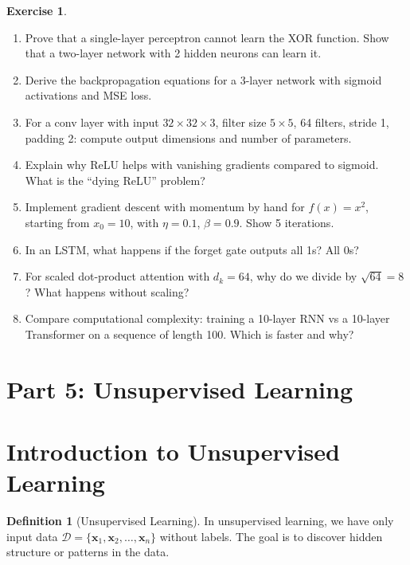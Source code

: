\documentclass[11pt,twoside]{article}
\numberwithin{equation}{section}
\newcommand{\vect}[1]{\bm{#1}}
\theoremstyle{plain}
\theoremstyle{definition}
\newtheorem{definition}[theorem]{Definition}
\newtheorem{exercise}[theorem]{Exercise}
\theoremstyle{remark}
\begin{document}
\begin{exercise}
\begin{enumerate}
\item Prove that a single-layer perceptron cannot learn the XOR function. Show that a two-layer network with 2 hidden neurons can learn it.

\item Derive the backpropagation equations for a 3-layer network with sigmoid activations and MSE loss.

\item For a conv layer with input $32 \times 32 \times 3$, filter size $5 \times 5$, 64 filters, stride 1, padding 2: compute output dimensions and number of parameters.

\item Explain why ReLU helps with vanishing gradients compared to sigmoid. What is the ``dying ReLU'' problem?

\item Implement gradient descent with momentum by hand for $f(x) = x^2$, starting from $x_0 = 10$, with $\eta = 0.1$, $\beta = 0.9$. Show 5 iterations.

\item In an LSTM, what happens if the forget gate outputs all 1s? All 0s?

\item For scaled dot-product attention with $d_k = 64$, why do we divide by $\sqrt{64} = 8$? What happens without scaling?

\item Compare computational complexity: training a 10-layer RNN vs a 10-layer Transformer on a sequence of length 100. Which is faster and why?
\end{enumerate}
\end{exercise}

\section*{Part 5: Unsupervised Learning}

\section{Introduction to Unsupervised Learning}
\label{sec:unsupervised-learning}

\begin{definition}[Unsupervised Learning]
In unsupervised learning, we have only input data $\mathcal{D} = \{\vect{x}_1, \vect{x}_2, \ldots, \vect{x}_n\}$ without labels. The goal is to discover hidden structure or patterns in the data.
\end{definition}
\end{document}
